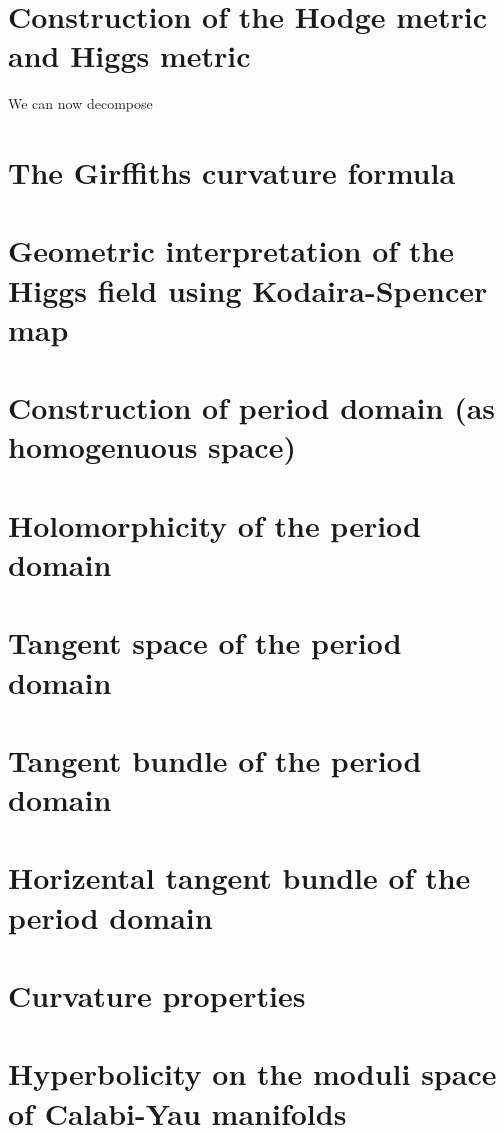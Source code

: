 \documentclass[11pt]{article}
\theoremstyle{definition}
\begin{document}
	\section{Construction of the Hodge metric and Higgs metric}
	
	We can now decompose 
	\section{The Girffiths curvature formula}
	\section{Geometric interpretation of the Higgs field using Kodaira-Spencer map}
	
	\section{Construction of period domain (as homogenuous space)}
	
	\section{Holomorphicity of the period domain}
	
	\section{Tangent space of the period domain}
	
	\section{Tangent bundle of the period domain}
	
	\section{Horizental tangent bundle of the period domain}
	
	\section{Curvature properties}
	
	\section{Hyperbolicity on the moduli space of Calabi-Yau manifolds}
	
\end{document}
